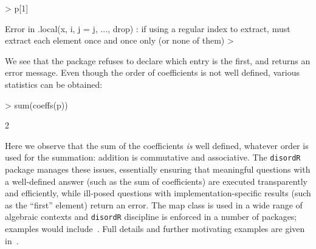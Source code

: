 \documentclass{birkjour}
\theoremstyle{definition}
\theoremstyle{remark}
\numberwithin{equation}{section}
\begin{document}
\begin{Schunk}
\begin{Sinput}
> p[1]
\end{Sinput}
\begin{Soutput}
Error in .local(x, i, j = j, ..., drop) : 
   if using a regular index to extract, must extract each
   element once and once only (or none of them)
> 
\end{Soutput}
\end{Schunk}

We see that the package refuses to declare which entry is the first,
and returns an error message.  Even though the order of coefficients
is not well defined, various statistics can be obtained:

\begin{Schunk}
\begin{Sinput}
> sum(coeffs(p))
\end{Sinput}
\begin{Soutput}
[1]  2
\end{Soutput}
\end{Schunk}

Here we observe that the sum of the coefficients {\em is} well
defined, whatever order is used for the summation: addition is
commutative and associative.  The {\tt disordR} package manages these
issues, essentially ensuring that meaningful questions with a
well-defined answer (such as the sum of coefficients) are executed
transparently and efficiently, while ill-posed questions with
implementation-specific results (such as the ``first'' element) return
an error.  The map class is used in a wide range of algebraic contexts
and {\tt disordR} discipline is enforced in a number of packages;
examples would
include~\cite{hankin2017_hyper2,hankin2023_frab,hankin2024_evitaicossa}.
Full details and further motivating examples are given
in~\cite{hankin2022_disordR}.
\end{document}
